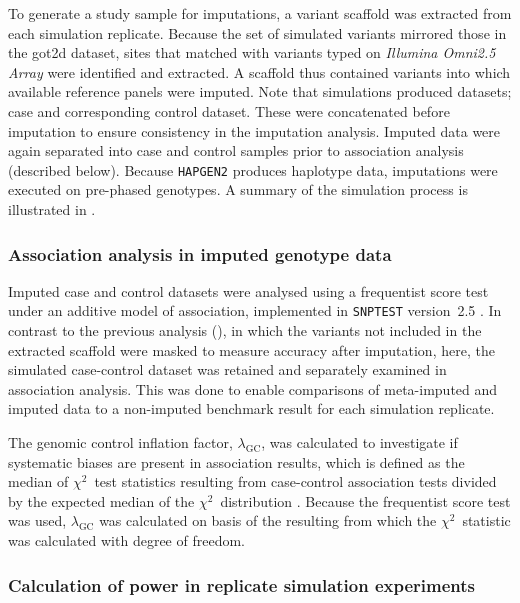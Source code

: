 To generate a study sample for imputations, a variant scaffold was extracted from each simulation replicate.
Because the set of simulated variants mirrored those in the \gls{got2d} dataset,
sites that matched with variants typed on \emph{Illumina Omni2.5 Array} were identified and extracted.
A scaffold thus contained  variants into which available reference panels were imputed.
Note that simulations produced  datasets;  case and  corresponding control dataset.
These were concatenated before imputation to ensure consistency in the imputation analysis.
Imputed data were again separated into case and control samples prior to association analysis (described below).
Because \texttt{HAPGEN2} produces haplotype data, imputations were executed on pre-phased genotypes.
A summary of the simulation process is illustrated in .



%
\subsubsection{Association analysis in imputed genotype data}
%

Imputed case and control datasets were analysed using a frequentist score test under an additive model of association, implemented in \texttt{SNPTEST} version~2.5 \citep{Marchini:2007bg}.
In contrast to the previous analysis (), in which the variants not included in the extracted scaffold were masked to measure accuracy after imputation, here, the simulated case-control dataset was retained and separately examined in association analysis.
This was done to enable comparisons of meta-imputed and imputed data to a non-imputed benchmark result for each simulation replicate.

The genomic control inflation factor, $\lambda_\text{GC}$, was calculated to investigate if systematic biases are present in association results, which is defined as the median of $\chi^2$~test statistics resulting from case-control association tests divided by the expected median of the $\chi^2$~distribution \citep{Devlin:2001ga}.
Because the frequentist score test was used, $\lambda_\text{GC}$ was calculated on basis of the resulting \pvalues from which the $\chi^2$~statistic was calculated with  degree of freedom.


%
\subsubsection{Calculation of power in replicate simulation experiments}
%

